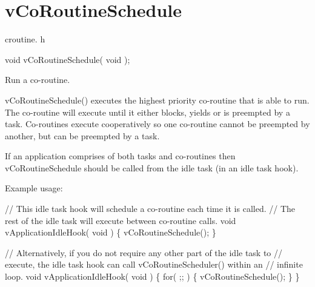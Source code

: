 \hypertarget{group__v_co_routine_schedule}{}\section{v\+Co\+Routine\+Schedule}
\label{group__v_co_routine_schedule}
croutine. h 
\begin{DoxyPre}
void vCoRoutineSchedule( void );\end{DoxyPre}


Run a co-\/routine.

v\+Co\+Routine\+Schedule() executes the highest priority co-\/routine that is able to run. The co-\/routine will execute until it either blocks, yields or is preempted by a task. Co-\/routines execute cooperatively so one co-\/routine cannot be preempted by another, but can be preempted by a task.

If an application comprises of both tasks and co-\/routines then v\+Co\+Routine\+Schedule should be called from the idle task (in an idle task hook).

Example usage\+: 
\begin{DoxyPre}
// This idle task hook will schedule a co-routine each time it is called.
// The rest of the idle task will execute between co-routine calls.
void vApplicationIdleHook( void )
\{
   vCoRoutineSchedule();
\}\end{DoxyPre}



\begin{DoxyPre}// Alternatively, if you do not require any other part of the idle task to
// execute, the idle task hook can call vCoRoutineScheduler() within an
// infinite loop.
void vApplicationIdleHook( void )
\{
   for( ;; )
   \{
       vCoRoutineSchedule();
   \}
\}
\end{DoxyPre}
 